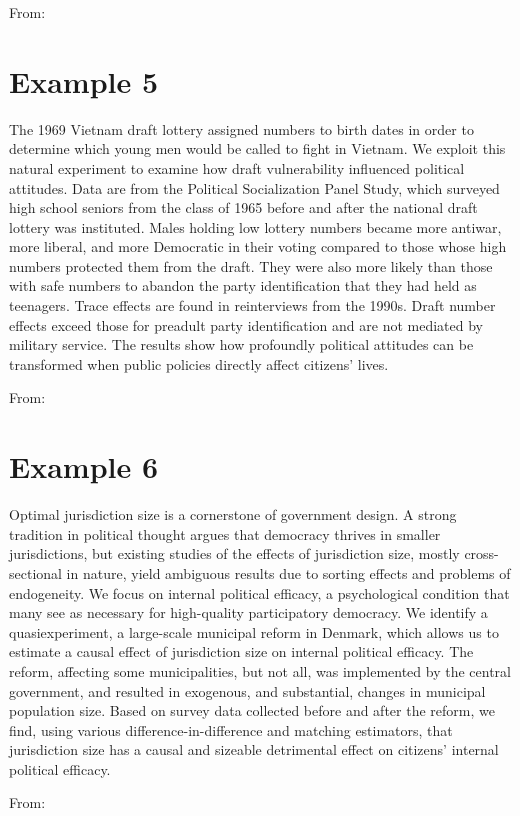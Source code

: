 \documentclass[a4, 12pt]{article}
\begin{document}
\vspace{1em}\noindent From: 

\clearpage

\section*{Example 5}

The 1969 Vietnam draft lottery assigned numbers to birth dates in order to determine which young men would be called to fight in Vietnam. We exploit this natural experiment to examine how draft vulnerability influenced political attitudes. Data are from the Political Socialization Panel Study, which surveyed high school seniors from the class of 1965 before and after the national draft lottery was instituted. Males holding low lottery numbers became more antiwar, more liberal, and more Democratic in their voting compared to those whose high numbers protected them from the draft. They were also more likely than those with safe numbers to abandon the party identification that they had held as teenagers. Trace effects are found in reinterviews from the 1990s. Draft number effects exceed those for preadult party identification and are not mediated by military service. The results show how profoundly political attitudes can be transformed when public policies directly affect citizens' lives.

\vspace{1em}\noindent From: 

\section*{Example 6}

Optimal jurisdiction size is a cornerstone of government design. A strong tradition in political thought argues that democracy thrives in smaller jurisdictions, but existing studies of the effects of jurisdiction size, mostly cross-sectional in nature, yield ambiguous results due to sorting effects and problems of endogeneity. We focus on internal political efficacy, a psychological condition that many see as necessary for high-quality participatory democracy. We identify a quasiexperiment, a large-scale municipal reform in Denmark, which allows us to estimate a causal effect of jurisdiction size on internal political efficacy. The reform, affecting some municipalities, but not all, was implemented by the central government, and resulted in exogenous, and substantial, changes in municipal population size. Based on survey data collected before and after the reform, we find, using various difference-in-difference and matching estimators, that jurisdiction size has a causal and sizeable detrimental effect on citizens' internal political efficacy.


\vspace{1em}\noindent From: 


\end{document}
